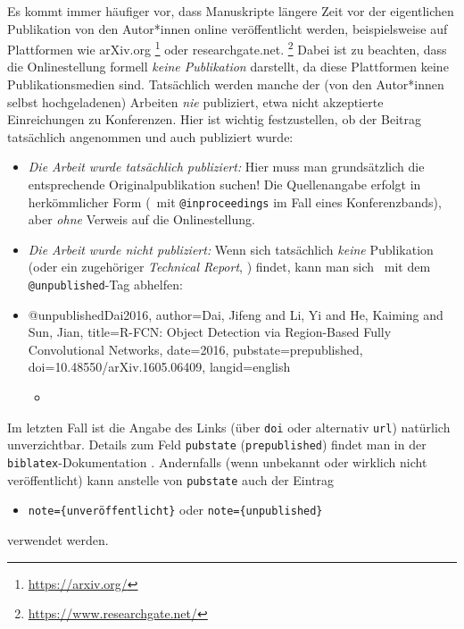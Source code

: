 Es kommt immer häufiger vor, dass Manuskripte längere Zeit vor der
eigentlichen Pub\-likation von den Autor*innen online veröffentlicht werden,
beispielsweise auf Plattformen wie \textsf{arXiv.org}%
\footnote{\url{https://arxiv.org/}}
oder \textsf{researchgate.net}.%
\footnote{\url{https://www.researchgate.net/}}
Dabei ist zu beachten, dass die Onlinestellung formell \emph{keine
Publikation} darstellt, da diese Plattformen keine Publikationsmedien sind.
Tatsächlich werden manche der (von den Autor*innen selbst hochgeladenen)
Arbeiten \emph{nie} publiziert, etwa nicht akzeptierte Einreichungen zu
Konferenzen. Hier ist wichtig festzustellen, ob der Beitrag tatsächlich
angenommen und auch publiziert wurde:
%
\begin{itemize}
\item[a)]
\emph{Die Arbeit wurde tatsächlich publiziert:} Hier muss man grundsätzlich
die entsprechende Original\-publikation suchen! Die Quellenangabe erfolgt in
herkömmlicher Form (\zB\ mit \texttt{@inproceedings} im Fall eines
Konferenzbands), aber \emph{ohne} Verweis auf die Onlinestellung.
\item[b)]
\emph{Die Arbeit wurde \emph{nicht} publiziert:} Wenn sich tatsächlich
\emph{keine} Publikation (oder ein zugehöriger \emph{Technical Report}, \so)
findet, kann man sich \evtl\ mit dem \texttt{@unpublished}-Tag abhelfen:
\item %
\begin{GenericCode}[numbers=none]
@unpublished{Dai2016,
  author={Dai, Jifeng and Li, Yi and He, Kaiming and Sun, Jian},
  title={{R-FCN:} Object Detection via Region-Based Fully Convolutional Networks},
  date={2016},
  pubstate={prepublished},
  doi={10.48550/arXiv.1605.06409},
  langid={english}
}
\end{GenericCode}
\begin{itemize}
\item[\cite{Dai2016}] 
\end{itemize}
\end{itemize}
%
Im letzten Fall ist die Angabe des Links (über \texttt{doi} oder alternativ
\texttt{url}) natürlich unverzichtbar. Details zum Feld \texttt{pubstate}
(\texttt{prepublished}) findet man in der \texttt{biblatex}-Dokumentation
\cite[Abschn.\ 4.9.2.11]{Kime2026}. Andernfalls (wenn unbekannt oder wirklich
nicht veröffentlicht) kann anstelle von \texttt{pubstate} auch der Eintrag
%
\begin{itemize}
\item[]\texttt{note=\{unveröffentlicht\}} \quad oder
   \quad \texttt{note=\{unpublished\}}
\end{itemize}
%
verwendet werden.


